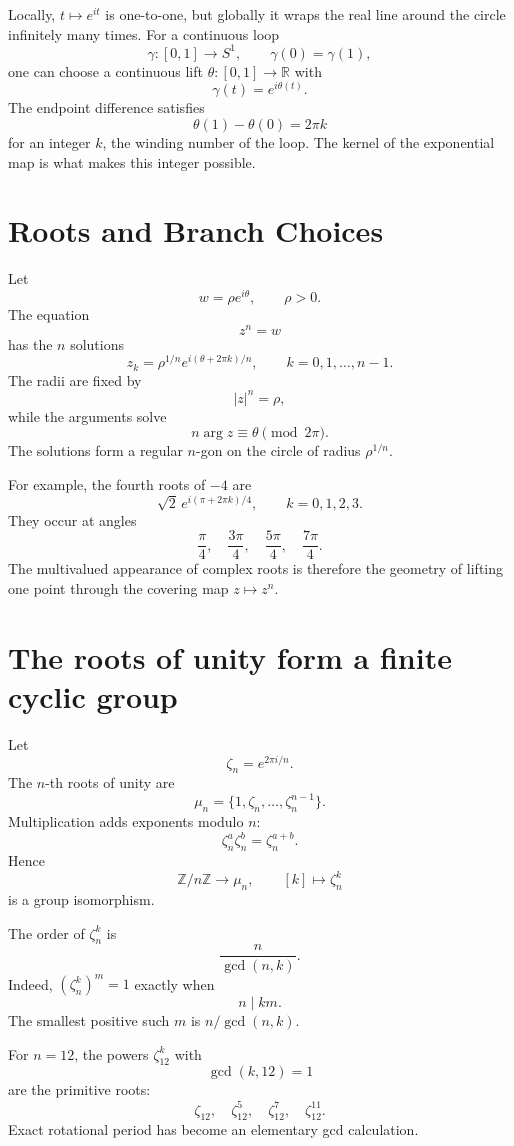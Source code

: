 Locally, \(t\mapsto e^{it}\) is one-to-one, but globally it wraps the real line around the circle infinitely many times.  For a continuous loop
\[
  \gamma:[0,1]\to S^1,
  \qquad
  \gamma(0)=\gamma(1),
\]
one can choose a continuous lift \(\theta:[0,1]\to\mathbb R\) with
\[
  \gamma(t)=e^{i\theta(t)}.
\]
The endpoint difference satisfies
\[
  \theta(1)-\theta(0)=2\pi k
\]
for an integer \(k\), the winding number of the loop.  The kernel of the exponential map is what makes this integer possible.

\section{Roots and Branch Choices}

Let
\[
  w=\rho e^{i\theta},
  \qquad \rho>0.
\]
The equation
\[
  z^n=w
\]
has the \(n\) solutions
\[
  z_k=\rho^{1/n}
  e^{i(\theta+2\pi k)/n},
  \qquad
  k=0,1,\ldots,n-1.
\]
The radii are fixed by
\[
  |z|^n=\rho,
\]
while the arguments solve
\[
  n\arg z\equiv\theta\pmod{2\pi}.
\]
The solutions form a regular \(n\)-gon on the circle of radius \(\rho^{1/n}\).

For example, the fourth roots of \(-4\) are
\[
  \sqrt2\,
  e^{i(\pi+2\pi k)/4},
  \qquad k=0,1,2,3.
\]
They occur at angles
\[
  \frac\pi4,
  \quad
  \frac{3\pi}4,
  \quad
  \frac{5\pi}4,
  \quad
  \frac{7\pi}4.
\]
The multivalued appearance of complex roots is therefore the geometry of lifting one point through the covering map \(z\mapsto z^n\).

\section{The roots of unity form a finite cyclic group}

Let
\[
  \zeta_n=e^{2\pi i/n}.
\]
The \(n\)-th roots of unity are
\[
  \mu_n=\{1,\zeta_n,\ldots,\zeta_n^{n-1}\}.
\]
Multiplication adds exponents modulo \(n\):
\[
  \zeta_n^a\zeta_n^b
  =\zeta_n^{a+b}.
\]
Hence
\[
  \boxed{
  \mathbb Z/n\mathbb Z\longrightarrow\mu_n,
  \qquad
  [k]\longmapsto\zeta_n^k}
\]
is a group isomorphism.

The order of \(\zeta_n^k\) is
\[
  \frac n{\gcd(n,k)}.
\]
Indeed, \((\zeta_n^k)^m=1\) exactly when
\[
  n\mid km.
\]
The smallest positive such \(m\) is \(n/\gcd(n,k)\).

For \(n=12\), the powers \(\zeta_{12}^k\) with
\[
  \gcd(k,12)=1
\]
are the primitive roots:
\[
  \zeta_{12},
  \quad
  \zeta_{12}^5,
  \quad
  \zeta_{12}^7,
  \quad
  \zeta_{12}^{11}.
\]
Exact rotational period has become an elementary gcd calculation.

